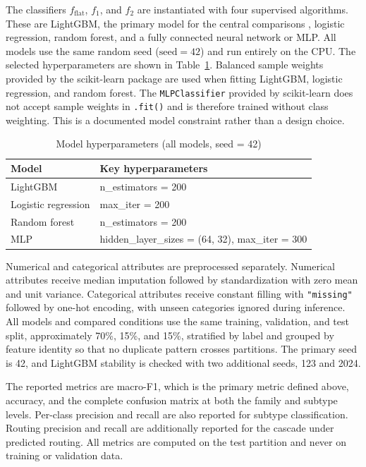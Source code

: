 \documentclass{IEEEoj}
\begin{document}
The classifiers $f_{\mathrm{flat}}$, $f_1$, and $f_2$ are instantiated with
four supervised algorithms. These are LightGBM, the primary model for the
central comparisons \cite{ke2017lightgbm}, logistic regression, random forest,
and a fully connected neural network or MLP. All models use the same random
seed ($\mathrm{seed}=42$) and run entirely on the CPU. The selected
hyperparameters are shown in Table~\ref{tab:hyperparams}. Balanced sample
weights provided by the scikit-learn package \cite{pedregosa2011scikit} are
used when fitting LightGBM, logistic regression, and random forest. The
\texttt{MLPClassifier} provided by scikit-learn does not accept sample weights
in \texttt{.fit()} and is therefore trained without class weighting. This is a
documented model constraint rather than a design choice.

\begin{table}[!t]
\caption{Model hyperparameters (all models, seed = 42)}
\label{tab:hyperparams}
\centering
\begin{tabular}{ll}
\toprule
Model & Key hyperparameters \\
\midrule
LightGBM & n\_estimators = 200 \\
Logistic regression & max\_iter = 200 \\
Random forest & n\_estimators = 200 \\
MLP & hidden\_layer\_sizes = (64, 32), max\_iter = 300 \\
\bottomrule
\end{tabular}
\end{table}

Numerical and categorical attributes are preprocessed separately. Numerical
attributes receive median imputation followed by standardization with zero
mean and unit variance. Categorical attributes receive constant filling with
\texttt{"missing"} followed by one-hot encoding, with unseen categories
ignored during inference. All models and compared conditions use the same
training, validation, and test split, approximately 70\%, 15\%, and 15\%,
stratified by label and grouped by feature identity so that no duplicate
pattern crosses partitions. The primary seed is 42, and LightGBM stability is
checked with two additional seeds, 123 and 2024.

The reported metrics are macro-F1, which is the primary metric defined above,
accuracy, and the complete confusion matrix at both the family and subtype
levels. Per-class precision and recall are also reported for subtype
classification. Routing precision and recall are additionally reported for the
cascade under predicted routing. All metrics are computed on the test partition and
never on training or validation data.
\end{document}
